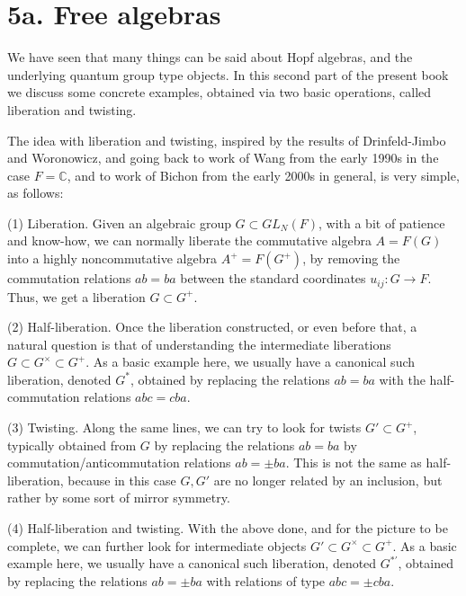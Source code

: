 \documentclass[12pt]{amsbook}
\begin{document}
\section*{5a. Free algebras}

We have seen that many things can be said about Hopf algebras, and the underlying quantum group type objects. In this second part of the present book we discuss some concrete examples, obtained via two basic operations, called liberation and twisting. 

\bigskip

The idea with liberation and twisting, inspired by the results of Drinfeld-Jimbo and Woronowicz, and going back to work of Wang from the early 1990s in the case $F=\mathbb C$, and to work of Bichon from the early 2000s in general, is very simple, as follows:

\bigskip

(1) Liberation. Given an algebraic group $G\subset GL_N(F)$, with a bit of patience and know-how, we can normally liberate the commutative algebra $A=F(G)$ into a highly noncommutative algebra $A^+=F(G^+)$, by removing the commutation relations $ab=ba$ between the standard coordinates $u_{ij}:G\to F$. Thus, we get a liberation $G\subset G^+$.

\bigskip

(2) Half-liberation. Once the liberation constructed, or even before that, a natural question is that of understanding the intermediate liberations $G\subset G^\times\subset G^+$. As a basic example here, we usually have a canonical such liberation, denoted $G^*$, obtained by replacing the relations $ab=ba$ with the half-commutation relations $abc=cba$.

\bigskip

(3) Twisting. Along the same lines, we can try to look for twists $G'\subset G^+$, typically obtained from $G$ by replacing the relations $ab=ba$ by commutation/anticommutation relations $ab=\pm ba$. This is not the same as half-liberation, because in this case $G,G'$ are no longer related by an inclusion, but rather by some sort of mirror symmetry.

\bigskip

(4) Half-liberation and twisting. With the above done, and for the picture to be complete, we can further look for intermediate objects $G'\subset G^\times\subset G^+$. As a basic example here, we usually have a canonical such liberation, denoted $G^{*\prime}$, obtained by replacing the relations $ab=\pm ba$ with relations of type $abc=\pm cba$.
\end{document}
